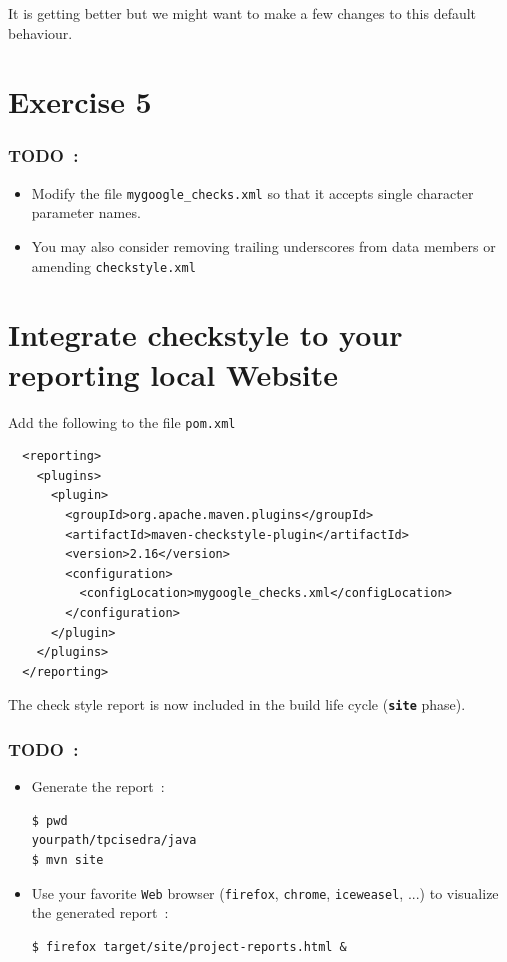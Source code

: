 \documentclass{article}
\begin{document}
It is getting better but we might want to make a few changes to this default behaviour.

\section{Exercise 5}

\subsubsection{TODO~:}

\begin{itemize}
\item  Modify the file \texttt{mygoogle\_checks.xml} so that it accepts single character parameter names.
\item You may also consider removing trailing underscores from data members or amending \texttt{checkstyle.xml}
\end{itemize}

\section{Integrate checkstyle to your reporting local Website}

Add the following to the file \texttt{pom.xml}
\begin{lstlisting}
  <reporting>
    <plugins>
      <plugin>
        <groupId>org.apache.maven.plugins</groupId>
        <artifactId>maven-checkstyle-plugin</artifactId>
        <version>2.16</version>
        <configuration>
          <configLocation>mygoogle_checks.xml</configLocation>
        </configuration>
      </plugin>
    </plugins>
  </reporting>
\end{lstlisting}

The check style report is now included in the build life cycle (\textbf{\texttt{site}} phase).

\subsubsection{TODO~:}

\begin {itemize}
\item Generate the report~:
\begin{lstlisting}
$ pwd
yourpath/tpcisedra/java
$ mvn site
\end{lstlisting}
\item Use your favorite \texttt{Web} browser (\texttt{firefox}, \texttt{chrome}, \texttt{iceweasel}, ...) to visualize the generated report~:
\begin{lstlisting}
$ firefox target/site/project-reports.html &
\end{lstlisting}
\end{itemize}
\end{document}
